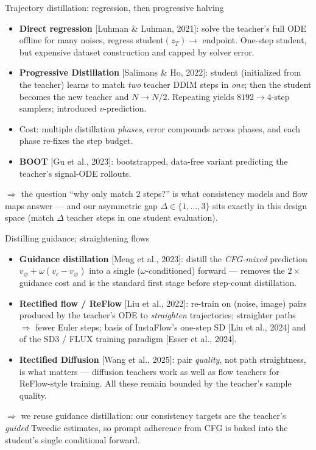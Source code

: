 \documentclass[aspectratio=169,10pt]{beamer}
\newcommand{\litref}[1]{{\scriptsize\color{black!55}[#1]}}
\newcommand{\takeaway}[1]{\vspace{0.25em}$\Rightarrow$ \alert{#1}}
\begin{document}
\begin{frame}{Trajectory distillation: regression, then progressive halving}
  \begin{itemize}
    \item \textbf{Direct regression} \litref{Luhman \& Luhman, 2021}: solve
      the teacher's full ODE offline for many noises, regress
      student$(z_T) \to$ endpoint. One-step student, but expensive dataset
      construction and capped by solver error.
    \item \textbf{Progressive Distillation} \litref{Salimans \& Ho, 2022}:
      student (initialized from the teacher) learns to match \emph{two}
      teacher DDIM steps in \emph{one}; then the student becomes the new
      teacher and $N \!\to\! N/2$. Repeating yields $8192 \to 4$-step
      samplers; introduced $v$-prediction.
    \item Cost: multiple distillation \emph{phases}, error compounds across
      phases, and each phase re-fixes the step budget.
    \item \textbf{BOOT} \litref{Gu et al., 2023}: bootstrapped, data-free
      variant predicting the teacher's signal-ODE rollouts.
  \end{itemize}
  \takeaway{the question ``why only match 2 steps?'' is what consistency
  models and flow maps answer --- and our asymmetric gap
  $\Delta \in \{1,\dots,3\}$ sits exactly in this design space (match
  $\Delta$ teacher steps in one student evaluation).}
\end{frame}

\begin{frame}{Distilling guidance; straightening flows}
  \begin{itemize}
    \item \textbf{Guidance distillation} \litref{Meng et al., 2023}: distill
      the \emph{CFG-mixed} prediction
      $v_\varnothing + \omega(v_c - v_\varnothing)$ into a single
      ($\omega$-conditioned) forward --- removes the $2\times$ guidance cost
      and is the standard first stage before step-count distillation.
    \item \textbf{Rectified flow / ReFlow} \litref{Liu et al., 2022}: re-train
      on (noise, image) pairs produced by the teacher's ODE to
      \emph{straighten} trajectories; straighter paths $\Rightarrow$ fewer
      Euler steps; basis of InstaFlow's one-step SD \litref{Liu et al., 2024}
      and of the SD3 / FLUX training paradigm \litref{Esser et al., 2024}.
    \item \textbf{Rectified Diffusion} \litref{Wang et al., 2025}: pair
      \emph{quality}, not path straightness, is what matters --- diffusion
      teachers work as well as flow teachers for ReFlow-style training. All
      these remain bounded by the teacher's sample quality.
  \end{itemize}
  \takeaway{we reuse guidance distillation: our consistency targets are the
  teacher's \emph{guided} Tweedie estimates, so prompt adherence from CFG is
  baked into the student's single conditional forward.}
\end{frame}
\end{document}
